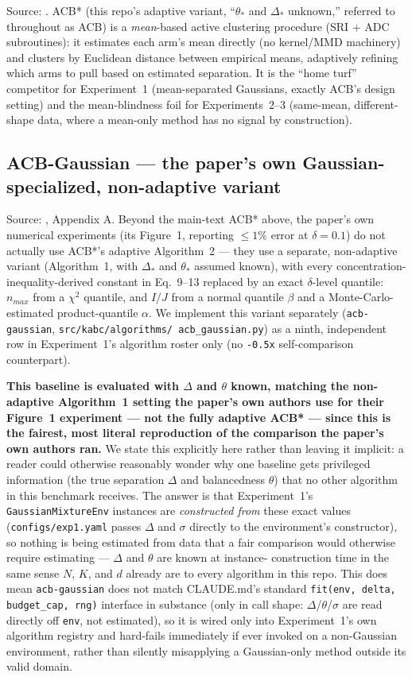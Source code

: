 \documentclass[11pt]{article}
\begin{document}
Source: \cite{acb2024}. ACB* (this repo's adaptive variant, ``$\theta_*$ and
$\Delta_*$ unknown,'' referred to throughout as ACB) is a \emph{mean}-based active
clustering procedure (SRI + ADC subroutines): it estimates each arm's mean
directly (no kernel/MMD machinery) and clusters by Euclidean distance between
empirical means, adaptively refining which arms to pull based on estimated
separation. It is the ``home turf'' competitor for Experiment~1 (mean-separated
Gaussians, exactly ACB's design setting) and the mean-blindness foil for
Experiments~2--3 (same-mean, different-shape data, where a mean-only method has no
signal by construction).

\subsection{ACB-Gaussian --- the paper's own Gaussian-specialized, non-adaptive variant}
\label{sec:acb-gaussian}

Source: \cite{acb2024}, Appendix A. Beyond the main-text ACB* above, the
paper's own numerical experiments (its Figure~1, reporting $\le 1\%$ error
at $\delta=0.1$) do not actually use ACB*'s adaptive Algorithm~2 --- they
use a separate, non-adaptive variant (Algorithm~1, with $\Delta_*$ and
$\theta_*$ assumed known), with every concentration-inequality-derived
constant in Eq.~9--13 replaced by an exact $\delta$-level quantile: $n_{max}$
from a $\chi^2$ quantile, and $I$/$J$ from a normal quantile $\beta$ and a
Monte-Carlo-estimated product-quantile $\alpha$. We implement this variant
separately (\texttt{acb-gaussian}, \texttt{src/kabc/algorithms/
acb\_gaussian.py}) as a ninth, independent row in Experiment~1's algorithm
roster only (no \texttt{-0.5x} self-comparison counterpart).

\textbf{This baseline is evaluated with $\Delta$ and $\theta$ known,
matching the non-adaptive Algorithm~1 setting the paper's own authors use
for their Figure~1 experiment --- not the fully adaptive ACB* --- since
this is the fairest, most literal reproduction of the comparison the
paper's own authors ran.} We state this explicitly here rather than leaving
it implicit: a reader could otherwise reasonably wonder why one baseline
gets privileged information (the true separation $\Delta$ and balancedness
$\theta$) that no other algorithm in this benchmark receives. The answer is
that Experiment~1's \texttt{GaussianMixtureEnv} instances are
\emph{constructed from} these exact values (\texttt{configs/exp1.yaml}
passes $\Delta$ and $\sigma$ directly to the environment's constructor), so
nothing is being estimated from data that a fair comparison would otherwise
require estimating --- $\Delta$ and $\theta$ are known at instance-
construction time in the same sense $N$, $K$, and $d$ already are to every
algorithm in this repo. This does mean \texttt{acb-gaussian} does not match
CLAUDE.md's standard \texttt{fit(env, delta, budget\_cap, rng)} interface in
substance (only in call shape: $\Delta$/$\theta$/$\sigma$ are read directly
off \texttt{env}, not estimated), so it is wired only into Experiment~1's
own algorithm registry and hard-fails immediately if ever invoked on a
non-Gaussian environment, rather than silently misapplying a Gaussian-only
method outside its valid domain.
\end{document}
